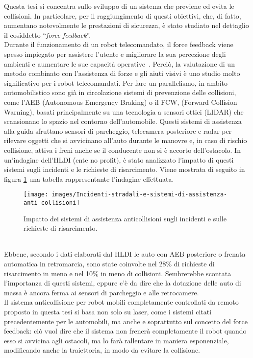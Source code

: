 Questa tesi si concentra sullo sviluppo di un sistema che previene ed evita le collisioni. In particolare, per il raggiungimento di questi obiettivi, che, di fatto, aumentano notevolmente le prestazioni di sicurezza, è stato studiato nel dettaglio il cosiddetto ``\textit{force feedback}''.\\ Durante il funzionamento di un robot telecomandato, il force feedback viene spesso impiegato per assistere l’utente e migliorare la sua percezione degli ambienti e aumentare le sue capacità operative~\cite{15, 16, 17}. Perciò, la valutazione di un metodo combinato con l'assistenza di forze e gli aiuti visivi è uno studio molto significativo per i robot telecomandati. Per fare un parallelismo, in ambito automobilistico sono già in circolazione sistemi di prevenzione delle collisioni, come l'AEB (Autonomous Emergency Braking) o il FCW, (Forward Collision Warning), basati principalmente su una tecnologia a sensori ottici (LIDAR) che scansionano lo spazio nel contorno dell'automobile. Questi sistemi di assistenza alla guida sfruttano sensori di parcheggio, telecamera posteriore e radar per rilevare oggetti che si avvicinano all’auto durante le manovre e, in caso di rischio collisione, attiva i freni anche se il conducente non si è accorto dell’ostacolo. In un'indagine dell’HLDI (ente no profit), è stato analizzato l’impatto di questi sistemi sugli incidenti e le richieste di risarcimento. Viene mostrata di seguito in figura \ref{fig:incidenti-stradali-e-sistemi-di-assistenza-anti-collisioni} una tabella rappresentante l'indagine effettuata.
\begin{figure}[h]
	\centering
	\texttt{[image: images/Incidenti-stradali-e-sistemi-di-assistenza-anti-collisioni]}
	\caption{Impatto dei sistemi di assistenza anticollisioni sugli incidenti e sulle richieste di risarcimento.}
	\label{fig:incidenti-stradali-e-sistemi-di-assistenza-anti-collisioni}
\end{figure}\\Ebbene, secondo i dati elaborati dal HLDI le auto con AEB posteriore o frenata automatica in retromarcia, sono state coinvolte nel 28\% di richieste di risarcimento in meno e nel 10\% in meno di collisioni. Sembrerebbe scontata l'importanza di questi sistemi, eppure c’è da dire che la dotazione delle auto di massa è ancora ferma ai sensori di parcheggio e alle retrocamere.\\
Il sistema anticollisione per robot mobili completamente controllati da remoto proposto in questa tesi si basa non solo su laser, come i sistemi citati precedentemente per le automobili, ma anche e soprattutto sul concetto del force feedback: ciò vuol dire che il sistema non frenerà completamente il robot quando esso si avvicina agli ostacoli, ma lo farà rallentare in maniera esponenziale, modificando anche la traiettoria, in modo da evitare la collisione.\\ 
